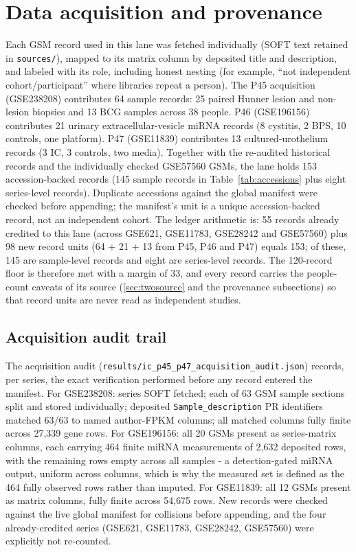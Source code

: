 \documentclass[11pt,a4paper]{article}
\begin{document}
\section{Data acquisition and provenance}
Each GSM record used in this lane was fetched individually (SOFT text retained
in \texttt{sources/}), mapped to its matrix column by deposited title and
description, and labeled with its role, including honest nesting (for example,
``not independent cohort/participant'' where libraries repeat a person). The
P45 acquisition (GSE238208) contributes 64 sample records: 25 paired Hunner
lesion and non-lesion biopsies and 13 BCG samples across 38 people. P46
(GSE196156) contributes 21 urinary extracellular-vesicle miRNA records
(8 cystitis, 2 BPS, 10 controls, one platform). P47 (GSE11839) contributes 13
cultured-urothelium records (3 IC, 3 controls, two media). Together with the
re-audited historical records and the individually checked GSE57560 GSMs,
the lane holds 153 accession-backed records (145 sample records in
Table~\ref{tab:accessions} plus eight series-level records). Duplicate accessions
against the global manifest were checked before appending; the manifest's unit
is a unique accession-backed record, not an independent cohort. The ledger
arithmetic is: 55 records already credited to this lane (across GSE621,
GSE11783, GSE28242 and GSE57560) plus 98 new record units (64 + 21 + 13 from
P45, P46 and P47) equals 153; of these, 145 are sample-level records and eight
are series-level records. The 120-record floor is therefore met with a margin
of 33, and every record carries the people-count caveats of its source
(\ref{sec:twosource} and the provenance subsections) so that record units are
never read as independent studies.

\begin{table}[h]\centering\small
\caption{Individually verified sample records by series and group.}
\label{tab:accessions}

\end{table}

\subsection{Acquisition audit trail}
The acquisition audit (\texttt{results/ic\_p45\_p47\_acquisition\_audit.json})
records, per series, the exact verification performed before any record entered
the manifest. For GSE238208: series SOFT fetched; each of 63 GSM sample
sections split and stored individually; deposited \texttt{Sample\_description}
PR identifiers matched 63/63 to named author-FPKM columns; all matched columns
fully finite across 27{,}339 gene rows. For GSE196156: all 20 GSMs present as
series-matrix columns, each carrying 464 finite miRNA measurements of 2{,}632
deposited rows, with the remaining rows empty across all samples - a
detection-gated miRNA output, uniform across columns, which is why the measured
set is defined as the 464 fully observed rows rather than imputed. For
GSE11839: all 12 GSMs present as matrix columns, fully finite across 54{,}675
rows. New records were checked against the live global manifest for collisions
before appending, and the four already-credited series (GSE621, GSE11783,
GSE28242, GSE57560) were explicitly not re-counted.
\end{document}
